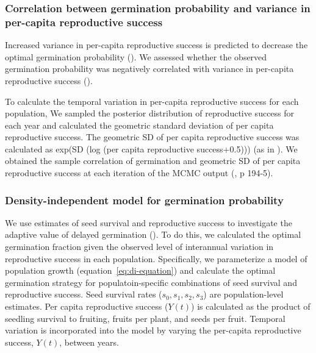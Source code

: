 \documentclass[12pt, oneside, titlepage]{article}   	%
\begin{document}

\subsubsection{Correlation between germination probability and variance in per-capita reproductive success}

Increased variance in per-capita reproductive success is predicted to decrease the optimal germination probability (\cite{cohen1966,ellner1985a}). We assessed whether the observed germination probability was negatively correlated with variance in per-capita reproductive success (\cite{venable2007}).

To calculate the temporal variation in per-capita reproductive success for each population, We sampled the posterior distribution of reproductive success for each year and calculated the geometric standard deviation of per capita reproductive success. The geometric SD of per capita reproductive success was calculated as exp(SD (log (per capita reproductive success+0.5))) (as in \cite{venable2007}). We obtained the sample correlation of germination and geometric SD of per capita reproductive success at each iteration of the MCMC output (\cite{hobbs2015b}, p 194-5). 


\subsubsection{Density-independent model for germination probability}

We use estimates of seed survival and reproductive success to investigate the adaptive value of delayed germination (\cite{gremer2014}). To do this, we calculated the optimal germination fraction given the observed level of interannual variation in reproductive success in each population. Specifically, we parameterize a model of population growth (equation~\ref{eq:di-equation}) and calculate the optimal germination strategy for populatoin-specific combinations of seed survival and reproductive success. Seed survival rates ($s_0, s_1, s_2, s_3$) are population-level estimates. Per capita reproductive success ($Y(t)$) is calculated as the product of seedling survival to fruiting, fruits per plant, and seeds per fruit. Temporal variation is incorporated into the model by varying the per-capita reproductive success, $Y(t)$, between years.
\end{document}
